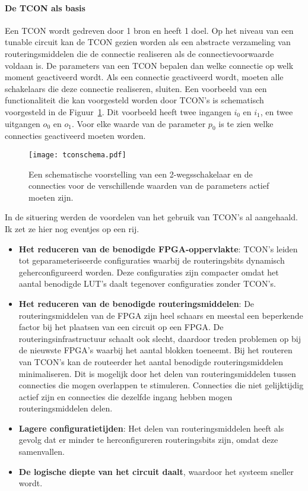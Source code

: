 \documentclass[a4paper,oneside,12pt]{article}
\begin{document}
\paragraph{De TCON als basis}
Een TCON wordt gedreven door 1 bron en heeft 1 doel. Op het niveau van een tunable circuit kan de TCON gezien worden als een abstracte verzameling van routeringsmiddelen die de connectie realiseren als de connectievoorwaarde voldaan is. De parameters van een TCON bepalen dan welke connectie op welk moment geactiveerd wordt. Als een connectie geactiveerd wordt, moeten alle schakelaars die deze connectie realiseren, sluiten. Een voorbeeld van een functionaliteit die kan voorgesteld worden door TCON's is schematisch voorgesteld in de Figuur~\ref{tconschema}. Dit voorbeeld heeft twee ingangen $i_0$ en $i_1$, en twee uitgangen $o_0$ en $o_1$. Voor elke waarde van de parameter $p_0$ is te zien welke connecties geactiveerd moeten worden.

\begin{figure}[ht]
\centering
\texttt{[image: tconschema.pdf]}
\caption{Een schematische voorstelling van een 2-wegsschakelaar en de connecties voor de verschillende waarden van de parameters actief moeten zijn.}
\label{tconschema}
\end{figure}

In de situering werden de voordelen van het gebruik van TCON's al aangehaald. Ik zet ze hier nog eventjes op een rij.
\begin{itemize}
\item \textbf{Het reduceren van de benodigde FPGA-oppervlakte}: TCON's leiden tot geparameteriseerde configuraties waarbij de routeringsbits dynamisch geherconfigureerd worden. Deze configuraties zijn compacter omdat het aantal benodigde LUT's daalt tegenover configuraties zonder TCON's. 
\item \textbf{Het reduceren van de benodigde routeringsmiddelen}: De routeringsmiddelen van de FPGA zijn heel schaars en meestal een beperkende factor bij het plaatsen van een circuit op een FPGA. De routeringsinfrastructuur schaalt ook slecht, daardoor treden problemen op bij de nieuwste FPGA's waarbij het aantal blokken toeneemt. Bij het routeren van TCON's kan de routeerder het aantal benodigde routeringsmiddelen minimaliseren. Dit is mogelijk door het delen van routeringsmiddelen tussen connecties die mogen overlappen te stimuleren. Connecties die niet gelijktijdig actief zijn en connecties die dezelfde ingang hebben mogen routeringsmiddelen delen.
\item \textbf{Lagere configuratietijden}: Het delen van routeringsmiddelen heeft als gevolg dat er minder te herconfigureren routeringsbits zijn, omdat deze samenvallen.
\item \textbf{De logische diepte van het circuit daalt}, waardoor het systeem sneller wordt.
\end{itemize}
\end{document}

